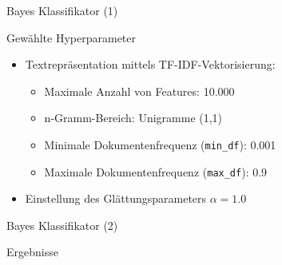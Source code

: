 \documentclass[aspectratio=169]{beamer} %
\begin{document}
\begin{frame}{Bayes Klassifikator (1)}
    \begin{block}{Gew\"ahlte Hyperparameter}
        \begin{itemize}
            \item Textrepr\"asentation mittels TF-IDF-Vektorisierung:
                  \begin{itemize}
                      \item Maximale Anzahl von Features: 10.000
                      
                      \item n-Gramm-Bereich: Unigramme (1,1)
                      
                      \item Minimale Dokumentenfrequenz (\texttt{min\_df}): 0.001
                      
                      \item Maximale Dokumentenfrequenz (\texttt{max\_df}): 0.9
                  \end{itemize}
                  
            \item Einstellung des Gl\"attungsparameters \(\alpha = 1.0\)
        \end{itemize}
    \end{block}
\end{frame}

\begin{frame}{Bayes Klassifikator (2)}
    \begin{block}{Ergebnisse}
        \begin{figure}
            \centering
            
            \qquad
        \end{figure}
    \end{block}
\end{frame}
\end{document}
